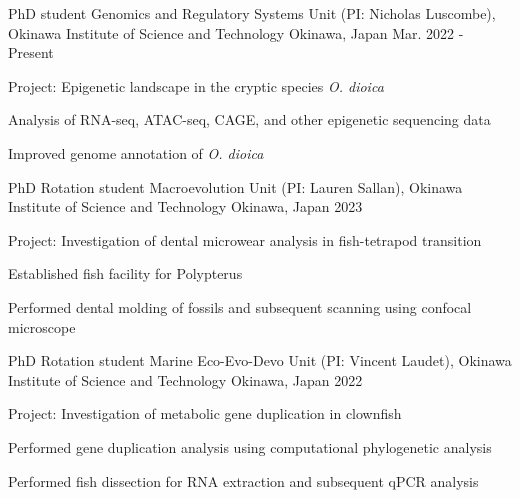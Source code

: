 

\begin{cventries}

  \cventry
    {PhD student} %
    {Genomics and Regulatory Systems Unit (PI: Nicholas Luscombe), Okinawa Institute of Science and Technology} %
    {Okinawa, Japan} %
    {Mar. 2022 - Present} %
    {
      \begin{cvitems} %
        \item {Project: Epigenetic landscape in the cryptic species \textit{O. dioica}}
        \item {Analysis of RNA-seq, ATAC-seq, CAGE, and other epigenetic sequencing data}
        \item {Improved genome annotation of \textit{O. dioica}}
      \end{cvitems}
    }

  \cventry
    {PhD Rotation student} %
    {Macroevolution Unit (PI: Lauren Sallan), Okinawa Institute of Science and Technology} %
    {Okinawa, Japan} %
    {2023} %
    {
      \begin{cvitems} %
        \item {Project: Investigation of dental microwear analysis in fish-tetrapod transition}
        \item {Established fish facility for Polypterus}
        \item {Performed dental molding of fossils and subsequent scanning using confocal microscope}
      \end{cvitems}
    }

  \cventry
    {PhD Rotation student} %
    {Marine Eco-Evo-Devo Unit (PI: Vincent Laudet), Okinawa Institute of Science and Technology} %
    {Okinawa, Japan} %
    {2022} %
    {
      \begin{cvitems} %
        \item {Project: Investigation of metabolic gene duplication in clownfish}
        \item {Performed gene duplication analysis using computational phylogenetic analysis}
        \item {Performed fish dissection for RNA extraction and subsequent qPCR analysis}
      \end{cvitems}
    }


\end{cventries}
